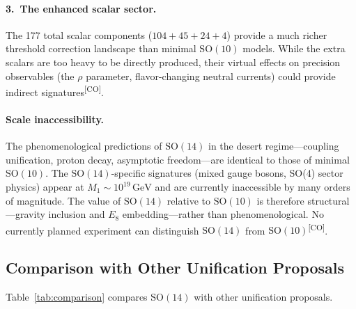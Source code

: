 \documentclass[aps,prd,twocolumn,showpacs,preprintnumbers,superscriptaddress,floatfix]{revtex4-2}
\newcommand{\GeV}{\,\mathrm{GeV}}
\newcommand{\CO}{\textsuperscript{[CO]}}
\begin{document}
\paragraph{3.\ The enhanced scalar sector.}
The 177 total scalar components ($104 + 45 + 24 + 4$) provide
a much richer threshold correction landscape than minimal
$\mathrm{SO}(10)$ models.  While the extra scalars are too heavy
to be directly produced, their virtual effects on precision
observables (the $\rho$ parameter, flavor-changing neutral currents)
could provide indirect signatures\CO.

\paragraph{Scale inaccessibility.}
The phenomenological predictions of $\mathrm{SO}(14)$ in the desert
regime---coupling unification, proton decay, asymptotic freedom---are
identical to those of minimal $\mathrm{SO}(10)$.  The
$\mathrm{SO}(14)$-specific signatures (mixed gauge bosons, SO(4)
sector physics) appear at $M_1 \sim 10^{19}\GeV$ and are currently
inaccessible by many orders of magnitude.  The value of
$\mathrm{SO}(14)$ relative to $\mathrm{SO}(10)$ is therefore
structural---gravity inclusion and $E_8$ embedding---rather than
phenomenological.  No currently planned experiment can distinguish
$\mathrm{SO}(14)$ from $\mathrm{SO}(10)$\CO.

\subsection{Comparison with Other Unification Proposals}

Table~\ref{tab:comparison} compares $\mathrm{SO}(14)$ with
other unification proposals.
\end{document}
